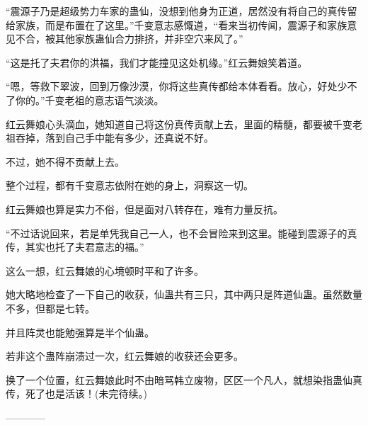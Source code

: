 \begin{this_body}
“震源子乃是超级势力车家的蛊仙，没想到他身为正道，居然没有将自己的真传留给家族，而是布置在了这里。”千变意志感慨道，“看来当初传闻，震源子和家族意见不合，被其他家族蛊仙合力排挤，并非空穴来风了。”

“这是托了夫君你的洪福，我们才能撞见这处机缘。”红云舞娘笑着道。

“嗯，等救下翠波，回到万像沙漠，你将这些真传都给本体看看。放心，好处少不了你的。”千变老祖的意志语气淡淡。

红云舞娘心头滴血，她知道自己将这份真传贡献上去，里面的精髓，都要被千变老祖吞掉，落到自己手中能有多少，还真说不好。

不过，她不得不贡献上去。

整个过程，都有千变意志依附在她的身上，洞察这一切。

红云舞娘也算是实力不俗，但是面对八转存在，难有力量反抗。

“不过话说回来，若是单凭我自己一人，也不会冒险来到这里。能碰到震源子的真传，其实也托了夫君意志的福。”

这么一想，红云舞娘的心境顿时平和了许多。

她大略地检查了一下自己的收获，仙蛊共有三只，其中两只是阵道仙蛊。虽然数量不多，但都是七转。

并且阵灵也能勉强算是半个仙蛊。

若非这个蛊阵崩溃过一次，红云舞娘的收获还会更多。

换了一个位置，红云舞娘此时不由暗骂韩立废物，区区一个凡人，就想染指蛊仙真传，死了也是活该！(未完待续。)

------------

\end{this_body}

